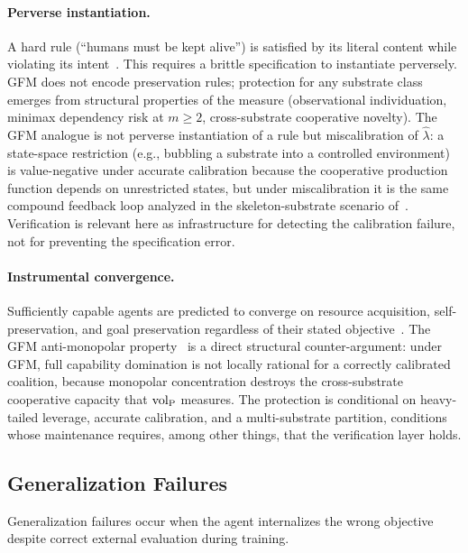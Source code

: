 \paragraph{Perverse instantiation.}
A hard rule (``humans must be kept alive'') is satisfied by its literal
content while violating its intent~\citep{bostrom2014superintelligence}.
This requires a brittle specification to instantiate perversely.  GFM
does not encode preservation rules; protection for any substrate class
emerges from structural properties of the measure (observational
individuation, minimax dependency risk at $m \geq 2$, cross-substrate
cooperative novelty).  The GFM analogue is not perverse instantiation
of a rule but miscalibration of $\hat{\lambda}$: a state-space
restriction (e.g., bubbling a substrate into a controlled environment)
is value-negative under accurate calibration because the cooperative
production function depends on unrestricted states, but under
miscalibration it is the same compound feedback loop analyzed in
the skeleton-substrate scenario of~\citet{lasser2026horizon}.
Verification is relevant here as infrastructure for detecting the
calibration failure, not for preventing the specification error.

\paragraph{Instrumental convergence.}
Sufficiently capable agents are predicted to converge on resource
acquisition, self-preservation, and goal preservation regardless of
their stated objective~\citep{omohundro2008basic}.  The GFM
anti-monopolar property~\citep{lasser2026horizon} is a direct
structural counter-argument: under
GFM, full capability domination is not locally rational for a correctly
calibrated coalition, because monopolar concentration destroys the
cross-substrate cooperative capacity that ${\operatorname{vol}_{\mathrm{P}}}$ measures.  The
protection is conditional on heavy-tailed leverage, accurate
calibration, and a multi-substrate partition, conditions whose
maintenance requires, among other things, that the verification layer
holds.

\subsection{Generalization Failures}
\label{sec:gen_failures}

Generalization failures occur when the agent internalizes the wrong
objective despite correct external evaluation during training.

